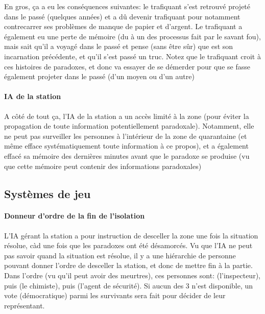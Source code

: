 {\begin{itemize}
		En gros, ça a eu les conséquences suivantes: le trafiquant s'est retrouvé projeté dans le passé (quelques années) et a dû devenir trafiquant pour notamment contrecarrer ses problèmes de manque de papier et d'argent. Le trafiquant a également eu une perte de mémoire (du à un des processus fait par le savant fou), mais sait qu'il a voyagé dans le passé et pense (sans être sûr) que \nmPlayerIII est son incarnation précédente, et qu'il s'est passé un truc. Notez que le trafiquant croit à ces histoires de paradoxes, et donc va essayer de se démerder pour que \nmPlayerIII se fasse également projeter dans le passé (d'un moyen ou d'un autre)
	\end{itemize}
	
	\paragraph{IA de la station} A côté de tout ça, l'IA de la station a un accès limité à la zone (pour éviter la propagation de toute information potentiellement paradoxale). Notamment, elle ne peut pas surveiller les personnes à l'intérieur de la zone de quarantaine (et même efface systématiquement toute information à ce propos), et a également effacé sa mémoire des dernières minutes avant que le paradoxe se produise (vu que cette mémoire peut contenir des informations paradoxales)
	
	
	\subsection{Systèmes de jeu}
	
	\paragraph{Donneur d'ordre de la fin de l'isolation} L'IA gérant la station a pour instruction de desceller la zone une fois la situation résolue, càd une fois que les paradoxes ont été désamorcés. Vu que l'IA ne peut pas savoir quand la situation est résolue, il y a une hiérarchie de personne pouvant donner l'ordre de desceller la station, et donc de mettre fin à la partie. Dans l'ordre (vu qu'il peut avoir des meurtres), ces personnes sont: \nmPlayerVII (l'inspecteur), puis \nmPlayerXII (le chimiste), puis \nmPlayerVIII (l'agent de sécurité). Si aucun des 3 n'est disponible, un vote (démocratique) parmi les survivants sera fait pour décider de leur représentant.
	
}
